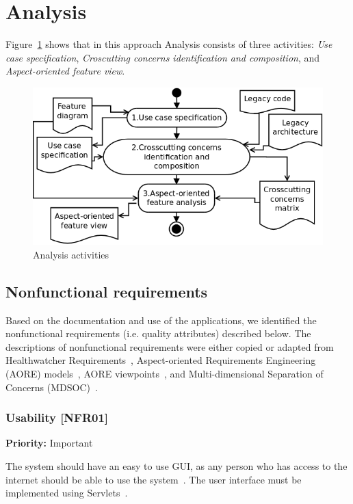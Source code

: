 \documentclass[11pt,twoside]{article}
\begin{document}
\section{Analysis}
\label{sec:analysis}

Figure~\ref{fig:analysis} shows that in this approach Analysis consists of three activities: \textit{Use case specification},
\textit{Croscutting concerns identification and composition}, and \textit{Aspect-oriented feature view}.


\begin{figure}[!htb]
   \centering
   \includegraphics[scale=0.28]{figs/analysis-v01.png}
   \caption{Analysis activities}
   \label{fig:analysis}
\end{figure}

\subsection{Nonfunctional requirements}

Based on the documentation and use of the applications, we identified the nonfunctional requirements (i.e. quality attributes)
described below. The descriptions of nonfunctional requirements were either copied or adapted from Healthwatcher
Requirements~\cite{hw-usecase}, Aspect-oriented Requirements Engineering (AORE) models~\cite{hw-aore}, AORE
viewpoints~\cite{hw-viewpoints-v2}, and Multi-dimensional Separation of Concerns (MDSOC)~\cite{hw-mdsoc}.

\subsubsection{Usability [NFR01]}

\textbf{Priority:} Important

The system should have an easy to use GUI, as any person who has access to the internet should be able to use the system~\cite{hw-usecase}.
The user interface must be implemented using
Servlets~\cite{hw-usecase}.
\end{document}
